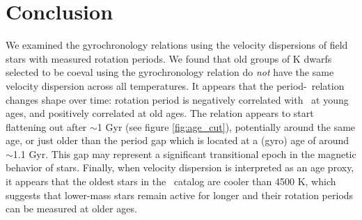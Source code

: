 \section{Conclusion}

We examined the gyrochronology relations using the velocity dispersions of
field stars with measured rotation periods.
We found that old groups of K dwarfs selected to be coeval using the
\citet{angus2019} gyrochronology relation do {\it not} have the same velocity
dispersion across all temperatures.
It appears that the period-\teff\ relation changes shape over time: rotation
period is negatively correlated with \teff\ at young ages, and positively
correlated at old ages.
The relation appears to start flattening out after $\sim$1 Gyr (see figure
\ref{fig:age_cut}), potentially around the same age, or just older than the
period gap which is located at a (gyro) age of around $\sim$1.1 Gyr.
This gap may represent a significant transitional epoch in the magnetic
behavior of stars.
Finally, when velocity dispersion is interpreted as an age proxy, it appears
that the oldest stars in the \mct\ catalog are cooler than 4500 K, which
suggests that lower-mass stars remain active for longer and their rotation
periods can be measured at older ages.




